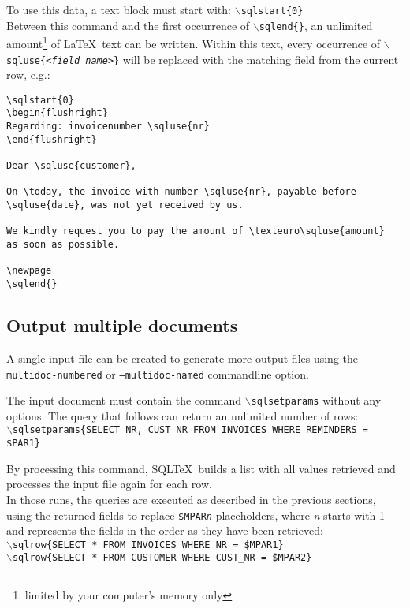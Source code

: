 \documentclass{article}
\newcommand{\bs}{\ensuremath{\backslash}}
\newcommand{\vs}{\vspace{3mm}}
\begin{document}
\vs

To use this data, a text block must start with: \texttt{\bs sqlstart\{0\}}\\
Between this command and the first occurrence of \texttt{\bs sqlend\{\}}, an unlimited amount\footnote{ limited by your computer's memory only} of \LaTeX\ text can be written. Within this text, every occurrence of \texttt{\bs sqluse\{<\textit{field name}>\}} will be replaced with the matching field from the current row, e.g.:

\noindent\begin{verbatim}
\sqlstart{0}
\begin{flushright}
Regarding: invoicenumber \sqluse{nr}
\end{flushright}

Dear \sqluse{customer},

On \today, the invoice with number \sqluse{nr}, payable before
\sqluse{date}, was not yet received by us.

We kindly request you to pay the amount of \texteuro\sqluse{amount}
as soon as possible.

\newpage
\sqlend{}
\end{verbatim}


\subsection{Output multiple documents}\label{multidoc}

A single input file can be created to generate more output files using the \texttt{--multidoc-numbered} or \texttt{--multidoc-named} commandline option.

The input document must contain the command \texttt{\bs sqlsetparams} without any options. The query that follows can return an unlimited number of rows: \\
\texttt{\bs sqlsetparams\{SELECT NR, CUST\_NR FROM INVOICES WHERE REMINDERS = \$PAR1\}}

\vs

By processing this command, SQL\TeX\ builds a list with all values retrieved and
processes the input file again for each row.\\
In those runs, the queries are executed as described in the previous sections,
using the returned fields to replace \texttt{\$MPAR\textit{n}} placeholders, where \textit{n} starts with 1 and represents the fields in the order as they have been retrieved:\\
\texttt{\bs sqlrow\{SELECT * FROM INVOICES WHERE NR = \$MPAR1\}} \\
\texttt{\bs sqlrow\{SELECT * FROM CUSTOMER WHERE CUST\_NR = \$MPAR2\}}
\end{document}
